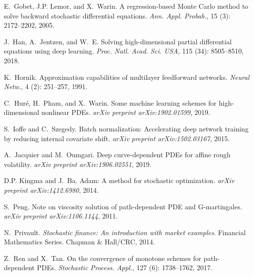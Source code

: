 \documentclass[12pt]{article}
\numberwithin{equation}{section}
\begin{document}
\begin{thebibliography}{26}
E.~Gobet, J.P. Lemor, and X.~Warin.
\newblock A regression-based {M}onte {C}arlo method to solve backward
  stochastic differential equations.
\newblock \emph{Ann. Appl. Probab.}, 15 (3): 2172--2202,
  2005.

J.~Han, A.~Jentzen, and W.~E.
\newblock Solving high-dimensional partial differential equations using deep
  learning.
\newblock \emph{Proc. Natl. Acad. Sci. USA}, 115 (34):
  8505--8510, 2018.

K.~Hornik.
\newblock Approximation capabilities of multilayer feedforward networks.
\newblock \emph{Neural Netw.}, 4 (2): 251--257, 1991.

C.~Hur{\'e}, H.~Pham, and X.~Warin.
\newblock Some machine learning schemes for high-dimensional nonlinear {PDEs}.
\newblock \emph{arXiv preprint arXiv:1902.01599}, 2019.

S.~Ioffe and C.~Szegedy.
\newblock Batch normalization: {Accelerating} deep network training by reducing
  internal covariate shift.
\newblock \emph{arXiv preprint arXiv:1502.03167}, 2015.

A.~Jacquier and M.~Oumgari.
\newblock Deep curve-dependent {PDEs} for affine rough volatility.
\newblock \emph{arXiv preprint arXiv:1906.02551}, 2019.

D.P. Kingma and J.~Ba.
\newblock Adam: {A} method for stochastic optimization.
\newblock \emph{arXiv preprint arXiv:1412.6980}, 2014.

S.~Peng.
\newblock Note on viscosity solution of path-dependent {PDE} and
  {G}-martingales.
\newblock \emph{arXiv preprint arXiv:1106.1144}, 2011.

N.~Privault.
\newblock \emph{Stochastic finance: An introduction with market examples}.
\newblock Financial Mathematics Series. Chapman \& Hall/CRC, 2014.

Z.~Ren and X.~Tan.
\newblock On the convergence of monotone schemes for path-dependent {PDEs}.
\newblock \emph{Stochastic Process. Appl.}, 127 (6):
  1738--1762, 2017.


\end{thebibliography}
\end{document}
